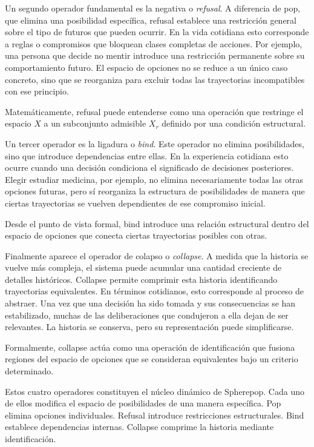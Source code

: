 \documentclass[12pt]{article}
\begin{document}
Un segundo operador fundamental es la negativa o \emph{refusal}. A diferencia de pop, que elimina una posibilidad específica, refusal establece una restricción general sobre el tipo de futuros que pueden ocurrir. En la vida cotidiana esto corresponde a reglas o compromisos que bloquean clases completas de acciones. Por ejemplo, una persona que decide no mentir introduce una restricción permanente sobre su comportamiento futuro. El espacio de opciones no se reduce a un único caso concreto, sino que se reorganiza para excluir todas las trayectorias incompatibles con ese principio.

Matemáticamente, refusal puede entenderse como una operación que restringe el espacio \(X\) a un subconjunto admisible \(X_r\) definido por una condición estructural.

Un tercer operador es la ligadura o \emph{bind}. Este operador no elimina posibilidades, sino que introduce dependencias entre ellas. En la experiencia cotidiana esto ocurre cuando una decisión condiciona el significado de decisiones posteriores. Elegir estudiar medicina, por ejemplo, no elimina necesariamente todas las otras opciones futuras, pero sí reorganiza la estructura de posibilidades de manera que ciertas trayectorias se vuelven dependientes de ese compromiso inicial.

Desde el punto de vista formal, bind introduce una relación estructural dentro del espacio de opciones que conecta ciertas trayectorias posibles con otras.

Finalmente aparece el operador de colapso o \emph{collapse}. A medida que la historia se vuelve más compleja, el sistema puede acumular una cantidad creciente de detalles históricos. Collapse permite comprimir esta historia identificando trayectorias equivalentes. En términos cotidianos, esto corresponde al proceso de abstraer. Una vez que una decisión ha sido tomada y sus consecuencias se han estabilizado, muchas de las deliberaciones que condujeron a ella dejan de ser relevantes. La historia se conserva, pero su representación puede simplificarse.

Formalmente, collapse actúa como una operación de identificación que fusiona regiones del espacio de opciones que se consideran equivalentes bajo un criterio determinado.

Estos cuatro operadores constituyen el núcleo dinámico de Spherepop. Cada uno de ellos modifica el espacio de posibilidades de una manera específica. Pop elimina opciones individuales. Refusal introduce restricciones estructurales. Bind establece dependencias internas. Collapse comprime la historia mediante identificación.
\end{document}
